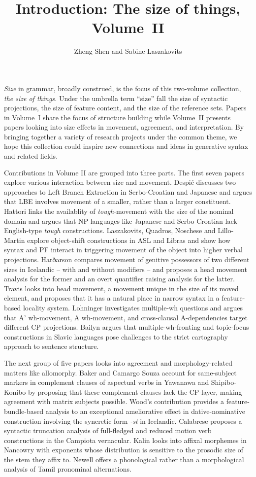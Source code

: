 \documentclass[output=paper]{langscibook}
\title{Introduction: The size of things, Volume~II}
\author{Zheng Shen\affiliation{National University of Singapore} and Sabine Laszakovits\affiliation{Austrian Academy of Sciences; University of Connecticut}}
\begin{document}
\maketitle

\noindent \textit{Size} in grammar, broadly construed, is the focus of this two-volume collection, \textit{the size of things.}
Under the umbrella term “size” fall the size of syntactic projections, the size of feature content, and the size of the reference sets. 
Papers in Volume~I share the focus of structure building while Volume~II presents papers looking into size effects in movement, agreement, and interpretation. 
By bringing together a variety of research projects under the common theme, we hope this collection could inspire new connections and ideas in generative syntax and related fields. 

Contributions in Volume II are grouped into three parts. The first seven papers explore various interaction between size and movement. 
Despić discusses two approaches to Left Branch Extraction in Serbo-Croatian and Japanese and argues that LBE involves movement of a smaller, rather than a larger constituent.
Hattori links the availablity of \textit{tough}-movement with the size of the nominal domain and argues that NP-languages like Japanese and Serbo-Croatian lack English-type \textit{tough} constructions. 
Laszakovits, Quadros, Noschese and Lillo-Martin explore object-shift constructions in ASL and Libras and show how syntax and PF interact in triggering movement of the object into higher verbal projections. 
Harðarson compares movement of genitive possessors of two different sizes in Icelandic -- with and without modifiers -- and proposes a head movement analysis for the former and an overt quantifier raising analysis for the latter.
Travis looks into head movement, a movement unique in the size of its moved element, and proposes that it has a natural place in narrow syntax in a feature-based locality system.
Lohninger investigates multiple-wh questions and argues that A' wh-movement, A wh-movement, and cross-clausal A-dependencies target different CP projections. 
Bailyn argues that multiple-wh-fronting and topic-focus constructions in Slavic languages pose challenges to the strict cartography approach to sentence structure. 

The next group of five papers looks into agreement and morphology-related matters like allomorphy. 
Baker and Camargo Souza account for same-subject markers in complement clauses of aspectual verbs in Yawanawa and Shipibo-Konibo by proposing that these complement clauses lack the CP-layer, making agreement with matrix subjects possible.
Wood's contribution provides a feature-bundle-based analysis to an exceptional ameliorative effect in dative-nominative construction involving the syncretic form \textit{-st} in Icelandic.
Calabrese proposes a syntactic truncation analysis of full-fledged and reduced motion verb constructions in the Campiota vernacular. 
Kalin looks into affixal morphemes in Nancowry with exponents whose distribution is sensitive to the prosodic size of the stem they affix to.
Newell offers a phonological rather than a morphological analysis of Tamil pronominal alternations. 
\end{document}
